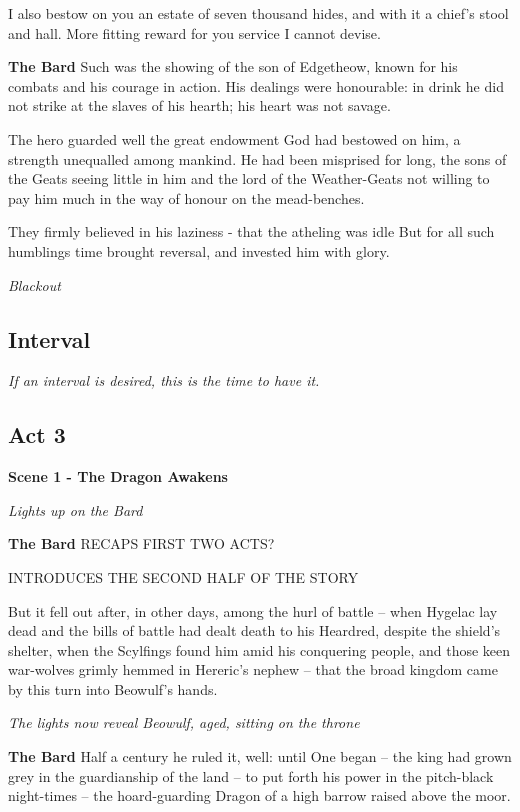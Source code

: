 \documentclass[a4paper]{article}
\begin{document}
{I also bestow on you an estate of seven thousand hides,
and with it a chief's stool and hall. 
More fitting reward for you service I cannot devise.

\textbf{The Bard} Such was the showing of the son of Edgetheow,
known for his combats and his courage in action.
His dealings were honourable: in drink he did not strike
at the slaves of his hearth; his heart was not savage.

The hero guarded well the great endowment
God had bestowed on him, a strength unequalled
among mankind. He had been misprised for long,
the sons of the Geats seeing little in him
and the lord of the Weather-Geats not willing to pay him
much in the way of honour on the mead-benches.

They firmly believed in his laziness - 
that the atheling was idle
But for all such humblings
time brought reversal, and invested him with glory.

\centerline{\textit{Blackout}}

\subsection{Interval}%

\centerline{\textit{If an interval is desired, this is the time to have it.}}

\subsection{Act 3}%

\centerline{\textbf{Scene 1 - The Dragon Awakens}}
\centerline{\textit{Lights up on the Bard}}

\textbf{The Bard} RECAPS FIRST TWO ACTS? 

INTRODUCES THE SECOND HALF OF THE STORY

But it fell out after, in other days,
among the hurl of battle – when Hygelac lay dead
and the bills of battle had dealt death to his Heardred,
despite the shield’s shelter, when the Scylfings found him
amid his conquering people, and those keen war-wolves
grimly hemmed in Hereric’s nephew –
that the broad kingdom came by this turn
into Beowulf’s hands.

\centerline{\textit{The lights now reveal Beowulf, aged, sitting on the throne}}

\textbf{The Bard} Half a century
he ruled it, well: until One began
– the king had grown grey in the guardianship of the land –
to put forth his power in the pitch-black night-times
– the hoard-guarding Dragon of a high barrow
raised above the moor.

}
\end{document}
